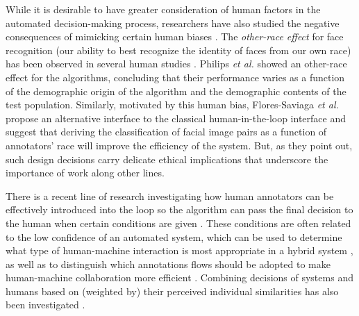 While it is desirable to have greater consideration of human factors in the automated decision-making process, researchers have also studied the negative consequences of mimicking certain human biases \cite{hupont2019demogpairs}. The \textit{other-race effect} for face recognition (our ability to best recognize the identity of faces from our own race) has been observed in several human studies \cite{meissner2001thirty,feliciano2016shades}. Philips {\em et al.} \cite{phillips2011other} showed an other-race effect for the algorithms, concluding that their performance varies as a function of the demographic origin of the algorithm and the demographic contents of the test population. Similarly, motivated by this human bias, Flores-Saviaga {\em et al.} \cite{flores2023inclusive} propose an alternative interface to the classical human-in-the-loop interface and suggest that deriving the classification of facial image pairs as a function of annotators' race will improve the efficiency of the system. But, as they point out, such design decisions carry delicate ethical implications that underscore the importance of work along other lines.
%

There is a recent line of research investigating how human annotators can be effectively introduced into the loop so the algorithm can pass the final decision to the human when certain conditions are given \cite{hemmer2023learning,mozannar2023should,keswani2021towards}. These conditions are often related to the low confidence of an automated system, which can be used to determine what type of human-machine interaction is most appropriate in a hybrid system \cite{punzi2024ai}, as well as to distinguish which annotations flows should be adopted to make human-machine collaboration more efficient \cite{lee2022towards}. Combining decisions of systems and humans based on (weighted by) their perceived individual similarities has also been investigated \cite{phillips2018face}.

